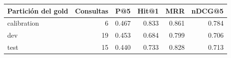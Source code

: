 \begin{tabular}{lrrrrr}
\toprule
Partición del gold & Consultas & P@5 & Hit@1 & MRR & nDCG@5 \\
\midrule
calibration & 6 & 0.467 & 0.833 & 0.861 & 0.784 \\
dev & 19 & 0.453 & 0.684 & 0.799 & 0.706 \\
test & 15 & 0.440 & 0.733 & 0.828 & 0.713 \\
\bottomrule
\end{tabular}
